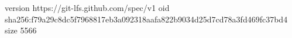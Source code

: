 version https://git-lfs.github.com/spec/v1
oid sha256:f79a29c8dc5f7968817eb3a092318aafa822b9034d25d7cd78a3fd469fc37bd4
size 5566
